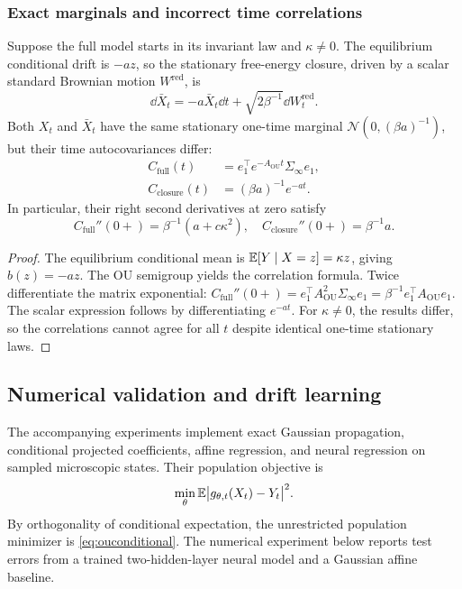 \documentclass[12pt,a4paper,oneside]{book}
\begin{document}
\subsubsection{Exact marginals and incorrect time correlations}
\begin{theorem}
\label{thm:correlationgap}
Suppose the full model starts in its invariant law and $\kappa\neq0$.
The equilibrium conditional drift is $-az$, so the stationary free-energy
closure, driven by a scalar standard Brownian motion $W^{\mathrm{red}}$, is
\begin{equation*}
\dd\bar X_t=-a\bar X_t\dd t+\sqrt{2\beta^{-1}}\dd W_t^{\mathrm{red}}.
\end{equation*}
Both $X_t$ and $\bar X_t$ have the same stationary one-time marginal
$\mathcal N(0,(\beta a)^{-1})$, but their time autocovariances differ:
\begin{equation*}
\begin{aligned}
C_{\mathrm{full}}(t)
 &=e_1^\top e^{-A_{\mathrm{OU}}t}\Sigma_\infty e_1,\\
 C_{\mathrm{closure}}(t)
 &=(\beta a)^{-1}e^{-at}.
\end{aligned}
\end{equation*}
In particular, their right second derivatives at zero satisfy
\begin{equation*}
C_{\mathrm{full}}''(0+)=\beta^{-1}(a+c\kappa^2),\quad
 C_{\mathrm{closure}}''(0+)=\beta^{-1}a.
\end{equation*}
\end{theorem}
\begin{proof}
The equilibrium conditional mean is $\mathbb{E}[Y\mid X=z]=\kappa z$,
giving $b(z)=-az$. The OU semigroup yields the correlation formula.
Twice differentiate the matrix exponential:
$C_{\mathrm{full}}''(0+)=e_1^\top A_{\mathrm{OU}}^2\Sigma_\infty e_1
=\beta^{-1}e_1^\top A_{\mathrm{OU}} e_1$.
The scalar expression follows by differentiating $e^{-at}$.
For $\kappa\neq0$, the results differ, so the correlations cannot agree
for all $t$ despite identical one-time stationary laws.
\end{proof}

\subsection{Numerical validation and drift learning}
The accompanying experiments implement exact Gaussian propagation,
conditional projected coefficients, affine regression, and neural regression
on sampled microscopic states. Their population objective is
\begin{equation*}
\min_\theta\mathbb{E}\big|g_{\theta,t}(X_t)-Y_t\big|^2.
\end{equation*}
By orthogonality of conditional expectation, the unrestricted
population minimizer is \eqref{eq:ouconditional}. The numerical experiment
below reports test errors from a trained two-hidden-layer neural model
and a Gaussian affine baseline.
\end{document}
